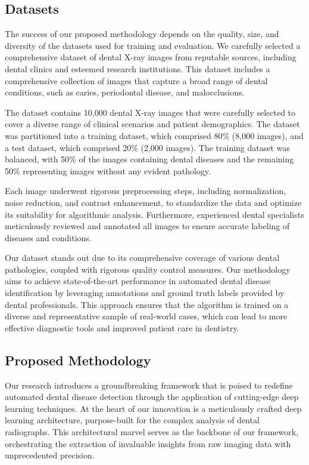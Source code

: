 \documentclass[journal,twoside,web]{ieeecolor}
\begin{document}
\subsection{Datasets}

The success of our proposed methodology depends on the quality, size, and diversity of the datasets used for training and evaluation. We carefully selected a comprehensive dataset of dental X-ray images from reputable sources, including dental clinics and esteemed research institutions. This dataset includes a comprehensive collection of images that capture a broad range of dental conditions, such as caries, periodontal disease, and malocclusions.

The dataset contains 10,000 dental X-ray images that were carefully selected to cover a diverse range of clinical scenarios and patient demographics. The dataset was partitioned into a training dataset, which comprised 80\% (8,000 images), and a test dataset, which comprised 20\% (2,000 images). The training dataset was balanced, with 50\% of the images containing dental diseases and the remaining 50\% representing images without any evident pathology.

Each image underwent rigorous preprocessing steps, including normalization, noise reduction, and contrast enhancement, to standardize the data and optimize its suitability for algorithmic analysis. Furthermore, experienced dental specialists meticulously reviewed and annotated all images to ensure accurate labeling of diseases and conditions.

Our dataset stands out due to its comprehensive coverage of various dental pathologies, coupled with rigorous quality control measures. Our methodology aims to achieve state-of-the-art performance in automated dental disease identification by leveraging annotations and ground truth labels provided by dental professionals. This approach ensures that the algorithm is trained on a diverse and representative sample of real-world cases, which can lead to more effective diagnostic tools and improved patient care in dentistry.


\subsection{Proposed Methodology}

Our research introduces a groundbreaking framework that is poised to redefine automated dental disease detection through the application of cutting-edge deep learning techniques. At the heart of our innovation is a meticulously crafted deep learning architecture, purpose-built for the complex analysis of dental radiographs. This architectural marvel serves as the backbone of our framework, orchestrating the extraction of invaluable insights from raw imaging data with unprecedented precision.
\end{document}
